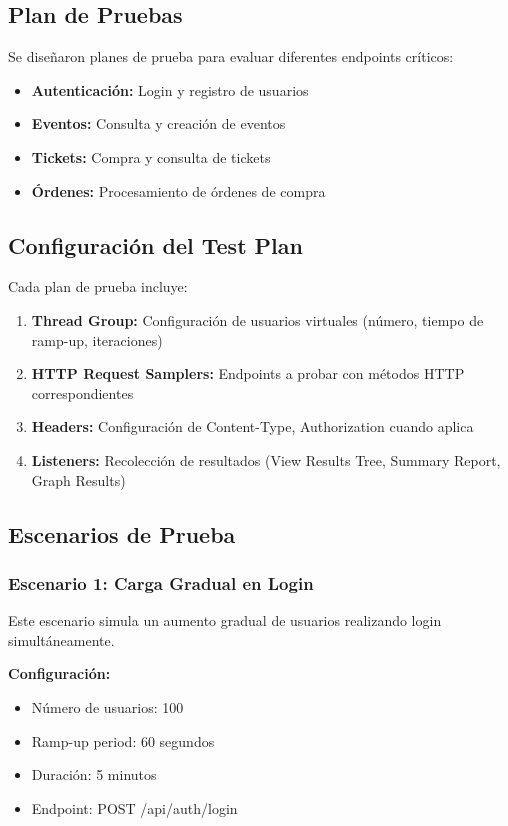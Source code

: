 \documentclass[12pt,a4paper]{article}
\begin{document}
\subsection{Plan de Pruebas}

Se diseñaron planes de prueba para evaluar diferentes endpoints críticos:
\begin{itemize}
    \item \textbf{Autenticación:} Login y registro de usuarios
    \item \textbf{Eventos:} Consulta y creación de eventos
    \item \textbf{Tickets:} Compra y consulta de tickets
    \item \textbf{Órdenes:} Procesamiento de órdenes de compra
\end{itemize}

\subsection{Configuración del Test Plan}

Cada plan de prueba incluye:
\begin{enumerate}
    \item \textbf{Thread Group:} Configuración de usuarios virtuales (número, tiempo de ramp-up, iteraciones)
    \item \textbf{HTTP Request Samplers:} Endpoints a probar con métodos HTTP correspondientes
    \item \textbf{Headers:} Configuración de Content-Type, Authorization cuando aplica
    \item \textbf{Listeners:} Recolección de resultados (View Results Tree, Summary Report, Graph Results)
\end{enumerate}

\subsection{Escenarios de Prueba}

\subsubsection{Escenario 1: Carga Gradual en Login}

Este escenario simula un aumento gradual de usuarios realizando login simultáneamente.

\textbf{Configuración:}
\begin{itemize}
    \item Número de usuarios: 100
    \item Ramp-up period: 60 segundos
    \item Duración: 5 minutos
    \item Endpoint: POST /api/auth/login
\end{itemize}
\end{document}
